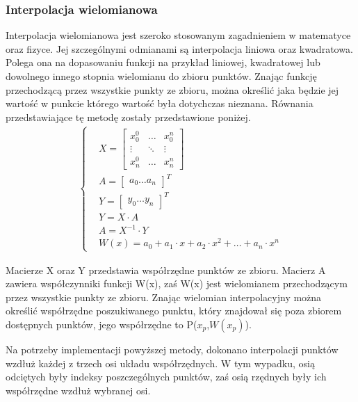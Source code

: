 \subsubsection{Interpolacja wielomianowa}
Interpolacja wielomianowa jest szeroko stosowanym zagadnieniem w matematyce oraz fizyce. Jej szczególnymi odmianami są interpolacja liniowa oraz kwadratowa. Polega ona na dopasowaniu funkcji na przykład liniowej, kwadratowej lub dowolnego innego stopnia wielomianu do zbioru punktów. Znając funkcję przechodzącą przez wszystkie punkty ze zbioru, można określić jaka będzie jej wartość w punkcie którego wartość była dotychczas nieznana. Równania przedstawiające tę metodę zostały przedstawione poniżej.
\begin{equation}
    \begin{aligned}
    \begin{cases}
            &X=\begin{bmatrix}
                    x_{0}^0 &\dots & x_{0}^n\\
                     \vdots  & \ddots & \vdots \\
                    x_{n}^0 &\dots & x_{n}^n
                \end{bmatrix}\\
            &A=\begin{bmatrix}a_{0}\dots a_{n}\end{bmatrix}^T\\
            &Y=\begin{bmatrix}y_{0}\dots y_{n}\end{bmatrix}^T\\
            &Y=X \cdot A\\
            &A=X^{-1} \cdot Y\\
            & W(x)=a_{0}+a_{1}\cdot x +a_{2}\cdot x^2+\ldots +a_{n}\cdot x^n
    \end{cases}
    \end{aligned}
    \label{equ:wielomianowaEqu}
\end{equation}

Macierze X oraz Y przedstawia współrzędne punktów ze zbioru. Macierz A zawiera współczynniki funkcji W(x), zaś W(x) jest wielomianem przechodzącym przez wszystkie punkty ze zbioru. Znając wielomian interpolacyjny można określić współrzędne poszukiwanego punktu, który znajdował się poza zbiorem dostępnych punktów, jego współrzędne to P($x_{p}$,$W(x_{p})$).

Na potrzeby implementacji powyższej metody, dokonano interpolacji punktów wzdłuż każdej z trzech osi układu współrzędnych. W tym wypadku, osią odciętych były indeksy poszczególnych punktów, zaś osią rzędnych były ich współrzędne wzdłuż wybranej osi. 
